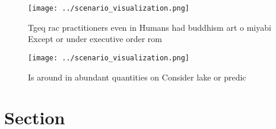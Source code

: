 \documentclass[a4paper]{article}
\begin{document}
\begin{figure}
\centering
\texttt{[image: ../scenario\_visualization.png]}
\caption{Tgeq rac practitioners even in Humans had buddhism art o miyabi Except or under executive order rom
}
\end{figure}
 
\begin{figure}
\centering
\texttt{[image: ../scenario\_visualization.png]}
\caption{Is around in abundant quantities on Consider lake or predic
}
\end{figure}
 
\section{Section}
\end{document}
